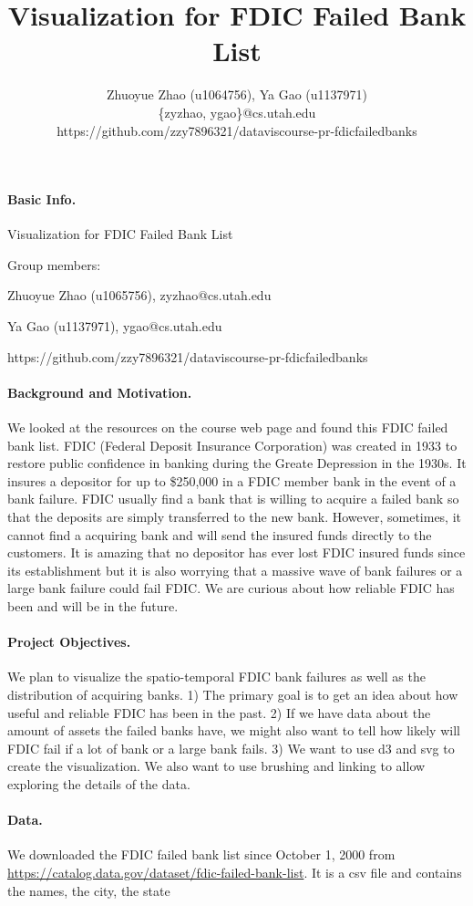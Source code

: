 \documentclass[11pt]{article}
\title{Visualization for FDIC Failed Bank List}
\author{Zhuoyue Zhao (u1064756), Ya Gao (u1137971)\\\{zyzhao, ygao\}@cs.utah.edu
\\https://github.com/zzy7896321/dataviscourse-pr-fdicfailedbanks}
\date{}
\begin{document}
\paragraph{Basic Info.} Visualization for FDIC Failed Bank List

Group members:

Zhuoyue Zhao (u1065756), zyzhao@cs.utah.edu

Ya Gao (u1137971), ygao@cs.utah.edu

https://github.com/zzy7896321/dataviscourse-pr-fdicfailedbanks


\paragraph{Background and Motivation.}

We looked at the resources on the course web page and found this FDIC failed
bank list. FDIC (Federal Deposit Insurance Corporation) was created in 1933
to restore public confidence in banking during the Greate Depression in the
1930s.  It insures a depositor for up to \$250,000 in a FDIC member bank in
the event of a bank failure. FDIC usually find a bank that is willing to
acquire a failed bank so that the deposits are simply transferred to the new
bank. However, sometimes, it cannot find a acquiring bank and will send the
insured funds directly to the customers. It is amazing that no depositor has
ever lost FDIC insured funds since its establishment but it is also worrying
that a massive wave of bank failures or a large bank failure could fail FDIC.
We are curious about how reliable FDIC has been and will be in the future.

\paragraph{Project Objectives.} 

We plan to visualize the spatio-temporal FDIC bank failures as well as the
distribution of acquiring banks. 1) The primary goal is to get an idea about
how useful and reliable FDIC has been in the past. 2) If we have data about
the amount of assets the failed banks have, we might also want to tell how
likely will FDIC fail if a lot of bank or a large bank fails. 3) We want to
use d3 and svg to create the visualization. We also want to use brushing and
linking to allow exploring the details of the data.

\paragraph{Data.}

We downloaded the FDIC failed bank list since October 1, 2000 from
\url{https://catalog.data.gov/dataset/fdic-failed-bank-list}. It is a csv file
and contains the names, the city, the state 
\end{document}
